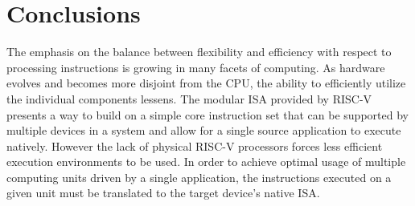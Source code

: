 \section{Conclusions}
\label{insn:concl}
The emphasis on the balance between flexibility and efficiency with respect to
processing instructions is growing in many facets of computing. As hardware
evolves and becomes more disjoint from the CPU, the ability to efficiently
utilize the individual components lessens. The modular ISA provided by RISC-V
presents a way to build on a simple core instruction set that can be supported
by multiple devices in a system and allow for a single source application to
execute natively. However the lack of physical RISC-V processors forces
less efficient execution environments to be used. In order to achieve optimal
usage of multiple computing units driven by a single application, the
instructions executed on a given unit must be translated to the target device's
native ISA.


